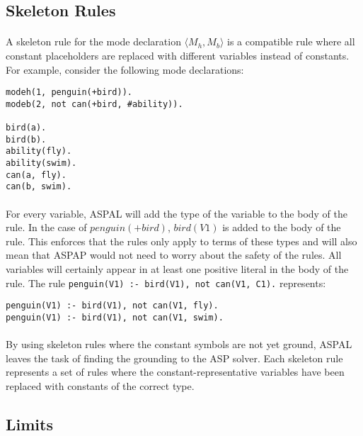 \documentclass{article}
\theoremstyle{plain}
\theoremstyle{definition}
\begin{document}
\begin{multicols}{2}
\subsection{Skeleton Rules}

\paragraph{} A skeleton rule for the mode declaration $\langle M_h, M_b \rangle$ is a compatible rule where all constant placeholders are replaced with different variables instead of constants. For example, consider the following mode declarations:

\begin{lstlisting}
modeh(1, penguin(+bird)).
modeb(2, not can(+bird, #ability)).

bird(a).
bird(b).
ability(fly).
ability(swim).
can(a, fly).
can(b, swim).
\end{lstlisting}

\paragraph{} For every variable, ASPAL will add the type of the variable to the body of the rule. In the case of $penguin(+bird)$, $bird(V1)$ is added to the body of the rule. This enforces that the rules only apply to terms of these types and will also mean that ASPAP would not need to worry about the safety of the rules. All variables will certainly appear in at least one positive literal in the body of the rule. The rule  \lstinline{penguin(V1) :- bird(V1), not can(V1, C1).} represents:

\begin{lstlisting}
penguin(V1) :- bird(V1), not can(V1, fly).
penguin(V1) :- bird(V1), not can(V1, swim).
\end{lstlisting}

\paragraph{} By using skeleton rules where the constant symbols are not yet ground, ASPAL leaves the task of finding the grounding to the ASP solver. Each skeleton rule represents a set of rules where the constant-representative variables have been replaced with constants of the correct type.

\subsection{Limits}


\end{multicols}
\end{document}
